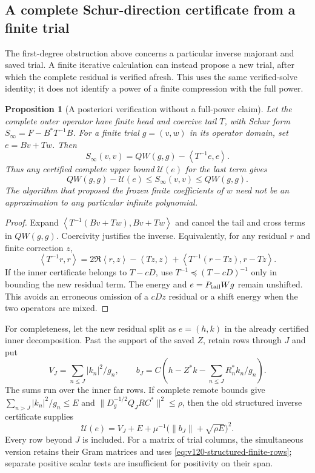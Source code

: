 \documentclass[11pt]{article}
\newtheorem{proposition}[theorem]{Proposition}
\theoremstyle{remark}
\newcommand{\norm}[1]{\left\lVert #1\right\rVert}
\newcommand{\ip}[2]{\left\langle #1,#2\right\rangle}
\begin{document}
\subsection*{A complete Schur-direction certificate from a finite trial}

The first-degree obstruction above concerns a particular inverse
majorant and saved trial. A finite iterative calculation can instead
propose a new trial, after which the complete residual is verified
afresh. This uses the same verified-solve identity; it does not
identify a power of a finite compression with the full power.

\begin{proposition}[A posteriori verification without a full-power claim]
\label{prop:v124-posterior-identity}
Let the complete outer operator have finite head and coercive
tail $T$, with Schur form $S_\infty=F-B^*T^{-1}B$.
For a finite trial $g=(v,w)$ in its operator domain, set
$e=Bv+Tw$. Then
\begin{equation}\label{eq:v124-posterior-identity}
 S_\infty(v,v)=QW(g,g)-\ip{T^{-1}e}{e}.
\end{equation}
Thus any certified complete upper bound $\mathcal U(e)$ for the
last term gives
\[
 QW(g,g)-\mathcal U(e)\le S_\infty(v,v)\le QW(g,g).
\]
The algorithm that proposed the frozen finite coefficients of $w$
need not be an approximation to any particular infinite polynomial.
\end{proposition}
\begin{proof}
Expand $\ip{T^{-1}(Bv+Tw)}{Bv+Tw}$ and cancel the tail and
cross terms in $QW(g,g)$. Coercivity justifies the inverse.
Equivalently, for any residual $r$ and finite correction $z$,
\[
 \ip{T^{-1}r}{r}
 =2\Re\ip rz-\ip{Tz}{z}
       +\ip{T^{-1}(r-Tz)}{r-Tz}.
\]
If the inner certificate belongs to $T-cD$, use
$T^{-1}\preceq(T-cD)^{-1}$ only in bounding the new residual
term. The energy and $e=P_{\rm tail}Wg$ remain unshifted.
This avoids an erroneous omission of a $cDz$ residual or a shift
energy when the two operators are mixed.
\end{proof}

For completeness, let the new residual split as $e=(h,k)$ in
the already certified inner decomposition. Past the support of
the saved $Z$, retain rows through $J$ and put
\[
 V_J=\sum_{n\le J}|k_n|^2/g_n,\qquad
 b_J=C\left(h-Z^*k-\sum_{n\le J}R_n^*k_n/g_n\right).
\]
The sums run over the inner far rows. If complete remote bounds
give $\sum_{n>J}|k_n|^2/g_n\le E$ and
$\|D_g^{-1/2}Q_JRC^*\|^2\le\rho$, then the old structured
inverse certificate supplies
\begin{equation}\label{eq:v124-posterior-upper}
 \mathcal U(e)=V_J+E+
       \mu^{-1}\bigl(\norm{b_J}+\sqrt{\rho E}\bigr)^2.
\end{equation}
Every row beyond $J$ is included. For a matrix of trial columns,
the simultaneous version retains their Gram matrices and uses
\eqref{eq:v120-structured-finite-rows}; separate positive scalar
tests are insufficient for positivity on their span.
\end{document}
